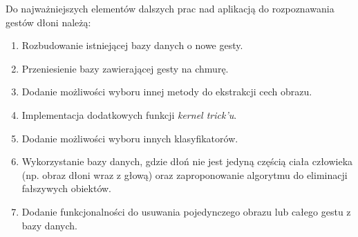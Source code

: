 \newpage
Do najważniejszych elementów dalszych prac nad aplikacją do rozpoznawania gestów dłoni należą:
\begin{enumerate}
	\item Rozbudowanie istniejącej bazy danych o nowe gesty.
	\item Przeniesienie bazy zawierającej gesty na chmurę.
	\item Dodanie możliwości wyboru innej metody do ekstrakcji cech obrazu.
	\item Implementacja dodatkowych funkcji \textit{kernel trick'u}.
	\item Dodanie możliwości wyboru innych klasyfikatorów.
	\item Wykorzystanie bazy danych, gdzie dłoń nie jest jedyną częścią ciała człowieka (np. obraz dłoni wraz z głową) oraz zaproponowanie algorytmu do eliminacji fałszywych obiektów.
	\item Dodanie funkcjonalności do usuwania pojedynczego obrazu lub całego gestu z bazy danych.
\end{enumerate} 

